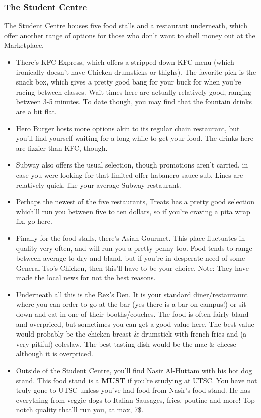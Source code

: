 \documentclass[11pt]{article}
\begin{document}
\subsubsection{The Student Centre}
The Student Centre houses five food stalls and a restaurant underneath, which offer another range of options for those who don't want to shell money out at the Marketplace.
\begin{itemize}
    \item There's KFC Express, which offers a stripped down KFC menu (which ironically doesn't have Chicken drumsticks or thighs).  The favorite pick is the snack box, which gives a pretty good bang for your buck for when you're racing between classes.  Wait times here are actually relatively good, ranging between 3-5 minutes.  To date though, you may find that the fountain drinks are a bit flat.
    \item Hero Burger hosts more options akin to its regular chain restaurant, but you'll find yourself waiting for a long while to get your food.  The drinks here are fizzier than KFC, though. \par
    \item Subway also offers the usual selection, though promotions aren't carried, in case you were looking for that limited-offer habanero sauce sub.  Lines are relatively quick, like your average Subway restaurant.\par
    \item Perhaps the newest of the five restaurants, Treats has a pretty good selection which'll run you between five to ten dollars, so if you're craving a pita wrap fix, go here.\par
    \item Finally for the food stalls, there's Asian Gourmet.  This place fluctuates in quality very often, and will run you a pretty penny too.  Food tends to range between average to dry and bland, but if you're in desperate need of some General Tso's Chicken, then this'll have to be your choice. Note: They have made the local news for not the best reasons. \par
    \item Underneath all this is the Rex's Den. It is your standard diner/restauraunt where you can order to go at the bar (yes there is a bar on campus!) or sit down and eat in one of their booths/couches. The food is often fairly bland and overpriced, but sometimes you can get a good value here. The best value would probably be the chicken breast & drumstick with french fries and (a very pitiful) coleslaw. The best tasting dish would be the mac & cheese although it is overpriced. \par
    \item Outside of the Student Centre, you'll find Nasir Al-Huttam with his hot dog stand.  This food stand is a \textbf{MUST} if you're studying at UTSC.  You have not truly gone to UTSC unless you've had food from Nasir's food stand.  He has everything from veggie dogs to Italian Sausages, fries, poutine and more!  Top notch quality that'll run you, at max, 7\$. \par
\end{itemize}
\end{document}
